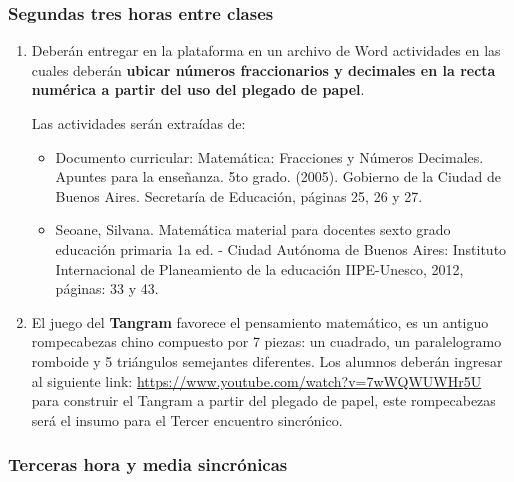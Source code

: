 \subsubsection{Segundas tres horas entre clases}

\begin{enumerate}
	\item Deberán entregar en la plataforma en un archivo de Word actividades en las cuales deberán \textbf{ubicar números fraccionarios y decimales en la recta numérica a partir del uso del plegado de papel}.
	
	Las actividades serán extraídas de:
	\begin{itemize}
		\item Documento curricular: Matemática: Fracciones y Números Decimales. Apuntes para la enseñanza. 5to grado. (2005). Gobierno de la Ciudad de Buenos Aires. Secretaría de Educación, páginas 25, 26 y 27.
		\item Seoane, Silvana. Matemática material para docentes sexto grado educación primaria 1a ed. - Ciudad Autónoma de Buenos Aires: Instituto Internacional de Planeamiento de la educación IIPE-Unesco, 2012, páginas: 33 y 43.
	\end{itemize}
	
	\item El juego del \textbf{Tangram} favorece el pensamiento matemático, es un antiguo rompecabezas chino compuesto por 7 piezas: un cuadrado, un paralelogramo romboide y 5 triángulos semejantes diferentes. Los alumnos deberán ingresar al siguiente link: \url{https://www.youtube.com/watch?v=7wWQWUWHr5U} para construir el Tangram a partir del plegado de papel, este rompecabezas será el insumo para el Tercer encuentro sincrónico.
\end{enumerate}

\subsubsection{Terceras hora y media sincrónicas}

